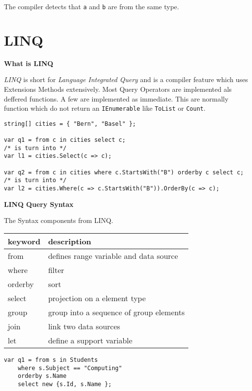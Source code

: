 \documentclass[11pt,twoside,landscape]{article}
\begin{document}
\begin{multicols}{3}
The compiler detects that \texttt{a} and \texttt{b} are from the same type. 

\section{LINQ}
\label{sec:orgfd1a39e}
\textbf{What is LINQ}

\emph{LINQ} is short for \emph{Language Integrated Query} and is a compiler feature which uses Extensions Methods extensively.
Most Query Operators are implemented als deffered functions.
A few are implemented as immediate.
This are normally function which do not return an \texttt{IEnumerable} like \texttt{ToList} or \texttt{Count}.


\lstset{language=csharp,label= ,caption= ,captionpos=b,numbers=none}
\begin{lstlisting}
string[] cities = { "Bern", "Basel" };

var q1 = from c in cities select c;
/* is turn into */
var l1 = cities.Select(c => c);

var q2 = from c in cities where c.StartsWith("B") orderby c select c;
/* is turn into */
var l2 = cities.Where(c => c.StartsWith("B")).OrderBy(c => c);
\end{lstlisting}

\textbf{LINQ Query Syntax}

The Syntax components from LINQ.


\begin{center}
\begin{tabular}{ll}
keyword & description\\
\hline
from & defines range variable and data source\\
where & filter\\
orderby & sort\\
select & projection on a element type\\
group & group into a sequence of group elements\\
join & link two data sources\\
let & define a support variable\\
\end{tabular}
\end{center}


\lstset{language=csharp,label= ,caption= ,captionpos=b,numbers=none}
\begin{lstlisting}
var q1 = from s in Students
    where s.Subject == "Computing"
    orderby s.Name
    select new {s.Id, s.Name };
\end{lstlisting}


\end{multicols}
\end{document}
